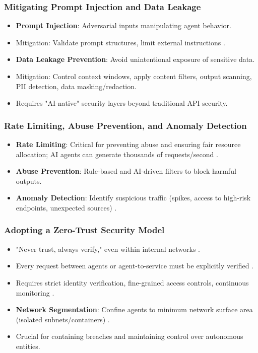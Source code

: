 \documentclass{beamer}       %
\begin{document}
\begin{frame}
    \frametitle{Mitigating Prompt Injection and Data Leakage}
    \begin{itemize}
        \item \textbf{Prompt Injection}: Adversarial inputs manipulating agent behavior.
        \item Mitigation: Validate prompt structures, limit external instructions .
        \item \textbf{Data Leakage Prevention}: Avoid unintentional exposure of sensitive data.
        \item Mitigation: Control context windows, apply content filters, output scanning, PII detection, data masking/redaction.
        \item Requires "AI-native" security layers beyond traditional API security.
    \end{itemize}
\end{frame}

\begin{frame}
    \frametitle{Rate Limiting, Abuse Prevention, and Anomaly Detection}
    \begin{itemize}
        \item \textbf{Rate Limiting}: Critical for preventing abuse and ensuring fair resource allocation; AI agents can generate thousands of requests/second .
        \item \textbf{Abuse Prevention}: Rule-based and AI-driven filters to block harmful outputs.
        \item \textbf{Anomaly Detection}: Identify suspicious traffic (spikes, access to high-risk endpoints, unexpected sources) .
    \end{itemize}
\end{frame}

\begin{frame}
    \frametitle{Adopting a Zero-Trust Security Model}
    \begin{itemize}
        \item "Never trust, always verify," even within internal networks .
        \item Every request between agents or agent-to-service must be explicitly verified .
        \item Requires strict identity verification, fine-grained access controls, continuous monitoring .
        \item \textbf{Network Segmentation}: Confine agents to minimum network surface area (isolated subnets/containers) .
        \item Crucial for containing breaches and maintaining control over autonomous entities.
    \end{itemize}
\end{frame}
\end{document}
